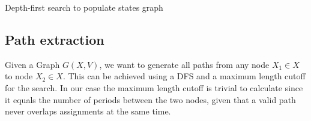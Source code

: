 \documentclass[a4paper,11pt]{article}
\begin{document}
    \begin{algorithm}
    \DontPrintSemicolon
    \BlankLine
    \caption{Depth-first search to populate states graph}\label{algo:graph-building}
    \end{algorithm}


  \subsection{Path extraction}

    Given a Graph $G(X,V)$, we want to generate all paths from any node $X_1 \in X$ to node $X_2 \in X$. This can be achieved using a DFS and a maximum length cutoff for the search. In our case the maximum length cutoff is trivial to calculate since it equals the number of periods between the two nodes, given that a valid path never overlaps assignments at the same time.
\end{document}
